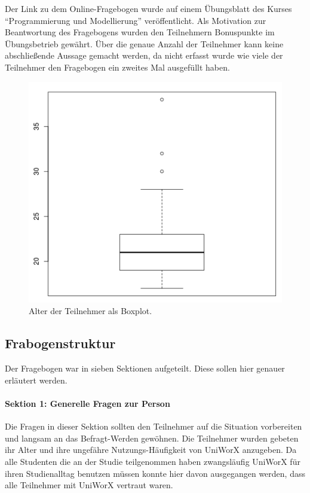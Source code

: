 \documentclass[11pt,a4paper,twoside,ngerman]{article}
\begin{document}
Der Link zu dem Online-Fragebogen wurde auf einem Übungsblatt des Kurses "`Programmierung und Modellierung"' veröffentlicht. Als Motivation zur Beantwortung des Fragebogens wurden den Teilnehmern Bonuspunkte im Übungsbetrieb gewährt.
Über die genaue Anzahl der Teilnehmer kann keine abschließende Aussage gemacht werden, da nicht erfasst wurde wie viele der Teilnehmer den Fragebogen ein zweites Mal ausgefüllt haben.

\begin{figure}
    \centering
    \includegraphics[width=\textwidth]{boxplot_age_2.png}
    \caption{Alter der Teilnehmer als Boxplot.}
    \label{fig:participants_age_bp}
\end{figure}

\subsection{Frabogenstruktur} \label{sec:study_structure}
Der Fragebogen war in sieben Sektionen aufgeteilt. Diese sollen hier genauer erläutert werden.

\paragraph{Sektion 1: Generelle Fragen zur Person}
Die Fragen in dieser Sektion sollten den Teilnehmer auf die Situation vorbereiten und langsam an das Befragt-Werden gewöhnen. Die Teilnehmer wurden gebeten ihr Alter und ihre ungefähre Nutzungs-Häufigkeit von UniWorX anzugeben. Da alle Studenten die an der Studie teilgenommen haben zwangsläufig UniWorX für ihren Studienalltag benutzen müssen konnte hier davon ausgegangen werden, dass alle Teilnehmer mit UniWorX vertraut waren.
\end{document}
